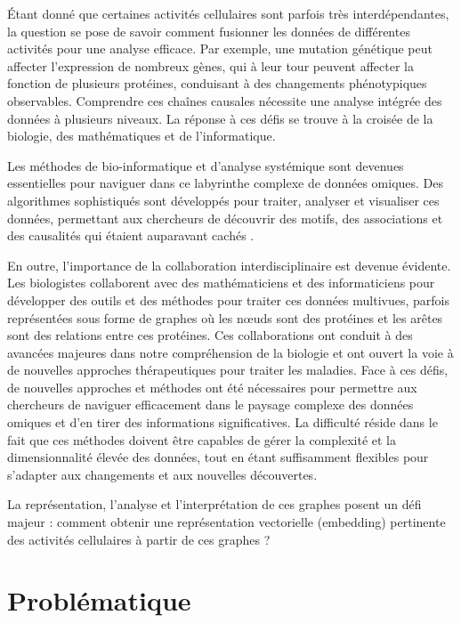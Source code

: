 Étant donné que certaines activités cellulaires sont parfois très interdépendantes, la question se pose de savoir comment fusionner les données de différentes activités pour une analyse efficace. Par exemple, une mutation génétique peut affecter l'expression de nombreux gènes, qui à leur tour peuvent affecter la fonction de plusieurs protéines, conduisant à des changements phénotypiques observables. Comprendre ces chaînes causales nécessite une analyse intégrée des données à plusieurs niveaux. La réponse à ces défis se trouve à la croisée de la biologie, des mathématiques et de l'informatique.

Les méthodes de bio-informatique et d'analyse systémique sont devenues essentielles pour naviguer dans ce labyrinthe complexe de données omiques. Des algorithmes sophistiqués sont développés pour traiter, analyser et visualiser ces données, permettant aux chercheurs de découvrir des motifs, des associations et des causalités qui étaient auparavant cachés \cite{wu2014}.

En outre, l'importance de la collaboration interdisciplinaire est devenue évidente. Les biologistes collaborent avec des mathématiciens et des informaticiens pour développer des outils et des méthodes pour traiter ces données multivues, parfois représentées sous forme de graphes où les nœuds sont des protéines et les arêtes sont des relations entre ces protéines. Ces collaborations ont conduit à des avancées majeures dans notre compréhension de la biologie et ont ouvert la voie à de nouvelles approches thérapeutiques pour traiter les maladies. Face à ces défis, de nouvelles approches et méthodes ont été nécessaires pour permettre aux chercheurs de naviguer efficacement dans le paysage complexe des données omiques et d'en tirer des informations significatives. La difficulté réside dans le fait que ces méthodes doivent être capables de gérer la complexité et la dimensionnalité élevée des données, tout en étant suffisamment flexibles pour s'adapter aux changements et aux nouvelles découvertes.

La représentation, l'analyse et l'interprétation de ces graphes posent un défi majeur : comment obtenir une représentation vectorielle (embedding) pertinente des activités cellulaires à partir de ces graphes ?

\section{Problématique}

